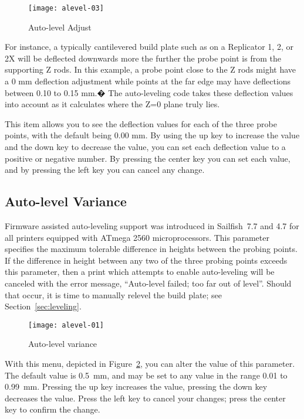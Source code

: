 \begin{figure}[!htbp]
  \centering
    \texttt{[image: alevel-03]}
    \caption{Auto-level Adjust}
  \label{fig:alevel-adj}
\end{figure}

For instance, a typically cantilevered build plate such as on a Replicator 1, 2, or 2X will be deflected downwards more the further the probe point is from the supporting Z rods. In this example, a probe point close to the Z rods might have a 0 mm deflection adjustment while points at the far edge may have deflections between 0.10 to 0.15 mm.� The auto-leveling code takes these deflection values into account as it calculates where the Z=0 plane truly lies.

This item allows you to see the deflection values for each of the three probe points, with the default being 0.00 mm. By using the up key to increase the value and the down key to decrease the value, you can set each deflection value to a positive or negative number. By pressing the center key you can set each value, and by pressing the left key you can cancel any change.


\subsection{Auto-level Variance} \label{sec:alevel-variance}

Firmware assisted auto-leveling support was introduced in Sailfish~7.7 and 4.7 for all printers equipped with ATmega 2560 microprocessors.  This parameter specifies the maximum tolerable difference in heights between the probing points.  If the difference in height between any two of the three probing points exceeds this parameter, then a print which attempts to enable auto-leveling will be canceled with the error message, ``Auto-level failed; too far out of level''.  Should that occur, it is time to manually relevel the build plate; see Section~\ref{sec:leveling}.

\begin{figure}[!htbp]
  \centering
    \texttt{[image: alevel-01]}
    \caption{Auto-level variance}
  \label{fig:alevel-variance}
\end{figure}

With this menu, depicted in Figure~\ref{fig:alevel-variance}, you can alter the value of this parameter.  The default value is 0.5~mm, and may be set to any value in the range 0.01 to 0.99~mm.  Pressing the up key increases the value, pressing the down key decreases the value.  Press the left key to cancel your changes; press the center key to confirm the change.

